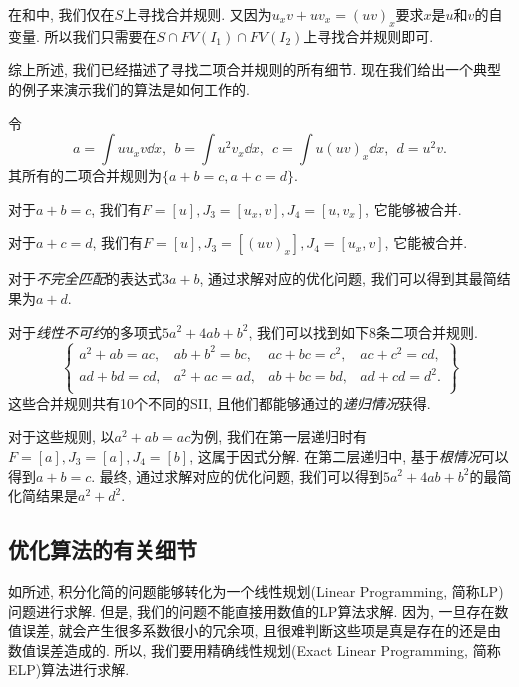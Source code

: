 在和中, 我们仅在$S$上寻找合并规则. 又因为$u_x v + u v_x = (uv)_x$要求$x$是$u$和$v$的自变量. 所以我们只需要在$S\cap FV(I_1) \cap FV(I_2)$上寻找合并规则即可. 

综上所述, 我们已经描述了寻找二项合并规则的所有细节. 现在我们给出一个典型的例子来演示我们的算法是如何工作的.

\begin{example} \label{eg-4-1}
令
\begin{equation}
a=\int\!{uu_xv \dd x},~~b=\int\!{u^2v_x\dd x},~~c=\int\!{u(uv)_x\dd x},~~d=u^2v.
\end{equation}
其所有的二项合并规则为$\{a+b=c,a+c=d\}$. 

对于$a+b=c$, 我们有$F=[u],J_3=[u_x,v],J_4=[u,v_x]$, 它能够被合并.

对于$a+c=d$, 我们有$F=[u],J_3=[(uv)_x],J_4=[u_x,v]$, 它能被合并.  

对于\emph{不完全匹配}的表达式$3a+b$, 通过求解对应的优化问题, 我们可以得到其最简结果为$a+d$.

对于\emph{线性不可约}的多项式$5a^2+4ab+b^2$, 我们可以找到如下8条二项合并规则.
\begin{equation}
\left\{ 
\begin{matrix}
a^2+ab=ac, &ab+b^2=bc, &ac+bc=c^2, &ac+c^2=cd,\\
ad+bd=cd,  &a^2+ac=ad, &ab+bc=bd,  &ad+cd=d^2.\\ 
\end{matrix}
\right\}
\end{equation}
这些合并规则共有10个不同的SII, 且他们都能够通过的\emph{递归情况}获得. 

对于这些规则, 以$a^2+ab=ac$为例, 我们在第一层递归时有$F=[a],J_3=[a],J_4=[b]$, 这属于因式分解. 在第二层递归中, 基于\emph{根情况}可以得到$a+b=c$. 最终, 通过求解对应的优化问题, 我们可以得到$5a^2+4ab+b^2$的最简化简结果是$a^2+d^2$.
\end{example}  

\subsection{优化算法的有关细节}\label{optMethods-03}

如所述, 积分化简的问题能够转化为一个线性规划(Linear Programming, 简称LP)问题进行求解. 但是, 我们的问题不能直接用数值的LP算法求解. 因为, 一旦存在数值误差, 就会产生很多系数很小的冗余项, 且很难判断这些项是真是存在的还是由数值误差造成的. 所以, 我们要用精确线性规划(Exact Linear Programming, 简称ELP)算法进行求解. 

